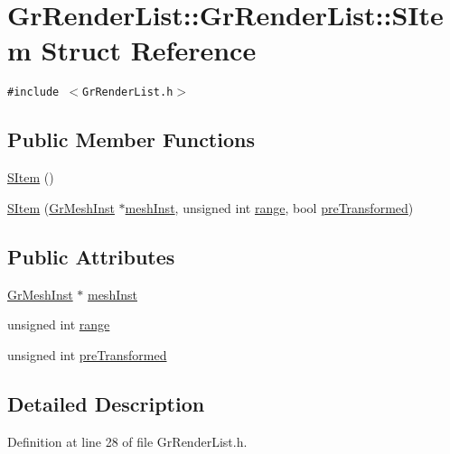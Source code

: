 \hypertarget{struct_gr_render_list_1_1_s_item}{
\section{GrRenderList::GrRenderList::SItem Struct Reference}
\label{struct_gr_render_list_1_1_s_item}
}
{\tt \#include $<$GrRenderList.h$>$}

\subsection*{Public Member Functions}
\begin{CompactItemize}
\item 
\hyperlink{struct_gr_render_list_1_1_s_item_cc6a5a62dad35a7fc0a38ad8e9f20ce2}{SItem} ()
\item 
\hyperlink{struct_gr_render_list_1_1_s_item_f136fee108179689dec2fb5ba57ae38e}{SItem} (\hyperlink{class_gr_mesh_inst}{GrMeshInst} $\ast$\hyperlink{struct_gr_render_list_1_1_s_item_d6ed05f00aea8fb71dfae70328e77bb8}{meshInst}, unsigned int \hyperlink{struct_gr_render_list_1_1_s_item_4585412be0e3084c369d507382bbe941}{range}, bool \hyperlink{struct_gr_render_list_1_1_s_item_2e41f93266e69ba59b799dbfebea3575}{preTransformed})
\end{CompactItemize}
\subsection*{Public Attributes}
\begin{CompactItemize}
\item 
\hyperlink{class_gr_mesh_inst}{GrMeshInst} $\ast$ \hyperlink{struct_gr_render_list_1_1_s_item_d6ed05f00aea8fb71dfae70328e77bb8}{meshInst}
\item 
unsigned int \hyperlink{struct_gr_render_list_1_1_s_item_4585412be0e3084c369d507382bbe941}{range}
\item 
unsigned int \hyperlink{struct_gr_render_list_1_1_s_item_2e41f93266e69ba59b799dbfebea3575}{preTransformed}
\end{CompactItemize}


\subsection{Detailed Description}


Definition at line 28 of file GrRenderList.h.

